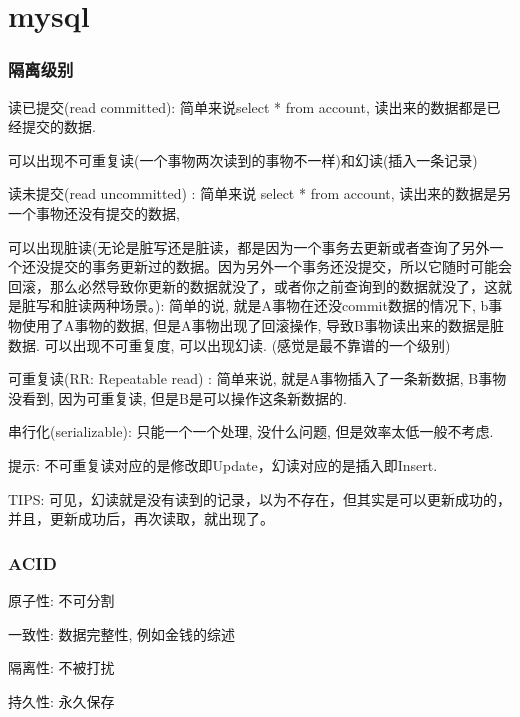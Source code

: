 \documentclass[UTF8]{ctexart}
\begin{document}
\subsubsection{}
\section{mysql}
\subsubsection{隔离级别}
\par
读已提交(read committed): 简单来说select * from account, 读出来的数据都是已经提交的数据.
\par 可以出现不可重复读(一个事物两次读到的事物不一样)和幻读(插入一条记录)
\par 
读未提交(read uncommitted) : 简单来说 select * from account, 读出来的数据是另一个事物还没有提交的数据, 
\par 可以出现脏读(无论是脏写还是脏读，都是因为一个事务去更新或者查询了另外一个还没提交的事务更新过的数据。因为另外一个事务还没提交，所以它随时可能会回滚，那么必然导致你更新的数据就没了，或者你之前查询到的数据就没了，这就是脏写和脏读两种场景。): 简单的说, 就是A事物在还没commit数据的情况下, b事物使用了A事物的数据, 但是A事物出现了回滚操作, 导致B事物读出来的数据是脏数据. 可以出现不可重复度, 可以出现幻读. (感觉是最不靠谱的一个级别)
\par 
可重复读(RR: Repeatable read) : 简单来说, 就是A事物插入了一条新数据, B事物没看到, 因为可重复读, 但是B是可以操作这条新数据的. 
\par 
串行化(serializable): 只能一个一个处理, 没什么问题, 但是效率太低一般不考虑.
\par 提示: 不可重复读对应的是修改即Update，幻读对应的是插入即Insert.
\par TIPS:
可见，幻读就是没有读到的记录，以为不存在，但其实是可以更新成功的，并且，更新成功后，再次读取，就出现了。
\subsubsection{ACID}
原子性: 不可分割
\par
一致性: 数据完整性, 例如金钱的综述
\par
隔离性: 不被打扰
\par
持久性: 永久保存
\end{document}
